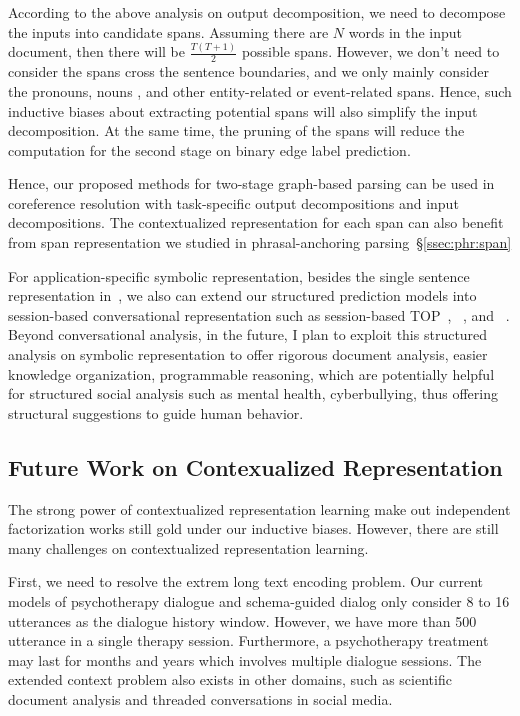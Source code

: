 According to the above analysis on output decomposition, we need to
decompose the inputs into candidate spans. Assuming there are $N$
words in the input document, then there will be $\frac{T(T+1)}{2}$
possible spans. However, we don't need to consider the spans cross the
sentence boundaries, and we only mainly consider the pronouns, nouns
, and other entity-related or event-related spans. Hence, such
inductive biases about extracting potential spans will also simplify
the input decomposition. At the same time, the pruning of the spans
will reduce the computation for the second stage on binary edge label
prediction.

Hence, our proposed methods for two-stage graph-based parsing can be
used in coreference resolution with task-specific output
decompositions and input decompositions. The contextualized
representation for each span can also benefit from span representation
we studied in phrasal-anchoring parsing~\S\ref{ssec:phr:span}

For application-specific symbolic representation, besides the single
sentence representation
in~\cite[TOP,][]{gupta-etal-2018-semantic-parsing}, we also can extend
our structured prediction models into session-based conversational
representation such as session-based
TOP~\cite{aghajanyan2020conversational},
~\cite[TreeDST,][]{cheng2020conversational}, and
~\cite[Dataflow,][]{andreas2020task}.  Beyond conversational analysis,
in the future, I plan to exploit this structured analysis on symbolic
representation to offer rigorous document analysis, easier knowledge
organization, programmable reasoning, which are potentially helpful
for structured social analysis such as mental health, cyberbullying,
thus offering structural suggestions to guide human behavior.

\subsection{Future Work on Contexualized Representation}
\label{ssec:future:contextural-rep}
The strong power of
contextualized representation learning make out independent
factorization works still gold under our inductive biases. However,
there are still many challenges on contextualized representation
learning.

 First, we need to resolve the extrem long
text encoding problem. Our current models of psychotherapy dialogue
and schema-guided dialog only consider 8 to 16 utterances as the
dialogue history window. However, we have more than 500 utterance in a
single therapy session. Furthermore, a psychotherapy treatment may
last for months and years which involves multiple dialogue
sessions. The extended context problem also exists in other domains, such
as scientific document analysis and threaded conversations in social
media.


